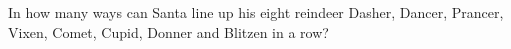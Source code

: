 In how many ways can Santa line up his eight reindeer Dasher, Dancer, Prancer, Vixen, Comet, Cupid, Donner and Blitzen in a row?
